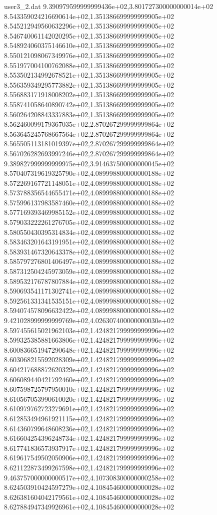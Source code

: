 \begin{filecontents}{user3_2.dat}
9.390979599999999436e+02,3.801727300000000014e+02
8.543359024216690614e+02,1.351386699999999905e+02
8.545212949560632296e+02,1.351386699999999905e+02
8.546740061142020295e+02,1.351386699999999905e+02
8.548924060375146610e+02,1.351386699999999905e+02
8.550121098067349976e+02,1.351386699999999905e+02
8.551977004100762088e+02,1.351386699999999905e+02
8.553502134992678521e+02,1.351386699999999905e+02
8.556359349295773882e+02,1.351386699999999905e+02
8.556883171918008202e+02,1.351386699999999905e+02
8.558741058640890742e+02,1.351386699999999905e+02
8.560264208843337883e+02,1.351386699999999905e+02
8.562460099179367035e+02,2.870267299999999864e+02
8.563645245768667564e+02,2.870267299999999864e+02
8.565505113181019397e+02,2.870267299999999864e+02
8.567026282693997246e+02,2.870267299999999864e+02
9.389827999999999975e+02,3.914637500000000045e+02
8.570407319619325790e+02,4.089998800000000188e+02
8.572269167721148051e+02,4.089998800000000188e+02
8.573788356544655471e+02,4.089998800000000188e+02
8.575996137983587460e+02,4.089998800000000188e+02
8.577169393469985152e+02,4.089998800000000188e+02
8.579033222261276705e+02,4.089998800000000188e+02
8.580550430395314834e+02,4.089998800000000188e+02
8.583463201643191951e+02,4.089998800000000188e+02
8.583931467320643378e+02,4.089998800000000188e+02
8.585797276801406497e+02,4.089998800000000188e+02
8.587312504245973059e+02,4.089998800000000188e+02
8.589532176787807884e+02,4.089998800000000188e+02
8.590693541171302741e+02,4.089998800000000188e+02
8.592561331341535151e+02,4.089998800000000188e+02
8.594074578096632422e+02,4.089998800000000188e+02
9.421028999999999769e+02,4.026307400000000030e+02
8.597455615021962103e+02,1.424821799999999996e+02
8.599325385881663806e+02,1.424821799999999996e+02
8.600836651947290648e+02,1.424821799999999996e+02
8.603068215592028309e+02,1.424821799999999996e+02
8.604217688872620329e+02,1.424821799999999996e+02
8.606089440421792460e+02,1.424821799999999996e+02
8.607598725797950010e+02,1.424821799999999996e+02
8.610567053990610020e+02,1.424821799999999996e+02
8.610979762723279691e+02,1.424821799999999996e+02
8.612853494961921115e+02,1.424821799999999996e+02
8.614360799648608236e+02,1.424821799999999996e+02
8.616604254396248734e+02,1.424821799999999996e+02
8.617741836573937917e+02,1.424821799999999996e+02
8.619617549502050906e+02,1.424821799999999996e+02
8.621122873499267598e+02,1.424821799999999996e+02
9.463757000000000517e+02,4.107308300000000258e+02
8.624503910424597279e+02,4.108454600000000028e+02
8.626381604042179561e+02,4.108454600000000028e+02
8.627884947349926961e+02,4.108454600000000028e+02

\end{filecontents}
